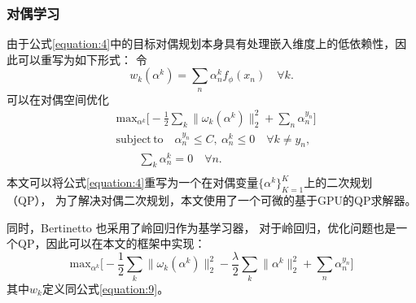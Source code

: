 
\subsubsection{对偶学习}

由于公式\ref{equation:4}中的目标对偶规划本身具有处理嵌入维度上的低依赖性，因此可以重写为如下形式：
令
\begin{equation}
    \label{equation:9}
    w_{k}(\alpha^{k}) = \sum_{n}{\alpha_{n}^{k} f_{\phi}(x_{n})} \quad \forall k.
\end{equation}
可以在对偶空间优化  
\begin{equation}
    \label{equation:10}
    \begin{aligned}
        &\mathrm{max}_{\alpha ^{k}} \big[ -\frac{1}{2} \sum_{k}\parallel\omega_{k}(\alpha^{k})\parallel_{2}^{2} + \sum_{n}\alpha_{n}^{y_{n}}\big]\\ 
        &\mathrm{subject \, to} \quad \alpha_{n}^{y_{n}} \leq C, \ \alpha_{n}^{k} \leq 0 \quad \forall k \neq y_{n} , \\ 
        &\qquad \sum_{k}{\alpha_{n}^{k}=0 \quad \forall n.}\\
    \end{aligned}
\end{equation}
本文可以将公式\ref{equation:4}重写为一个在对偶变量$\{\alpha^k\}^K_{K=1}$上的二次规划（QP），
为了解决对偶二次规划，本文使用了一个可微的基于GPU的QP求解器。

同时，Bertinetto  也采用了岭回归作为基学习器，
对于岭回归，优化问题也是一个QP，因此可以在本文的框架中实现：
\begin{equation}
    \label{equation:11}
    \mathrm{max}_{\alpha^{k}} \big[ - \frac{1}{2} \sum_{k} \parallel\omega_{k}(\alpha^{k}) \parallel_{2}^{2} - \frac{\lambda}{2} \sum_{k}{\parallel\alpha^{k}\parallel_{2}^{2}}+\sum_{n}{\alpha_{n}^{y_{n}}} \big] 
\end{equation}
其中$w_k$定义同公式\ref{equation:9}。

